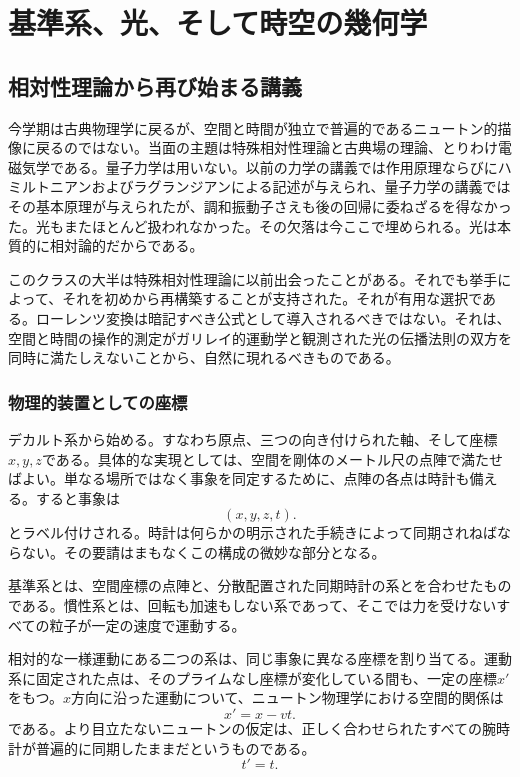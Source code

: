 \chapter{基準系、光、そして時空の幾何学}

\section{相対性理論から再び始まる講義}

今学期は古典物理学に戻るが、空間と時間が独立で普遍的であるニュートン的描像に戻るのではない。当面の主題は特殊相対性理論と古典場の理論、とりわけ電磁気学である。量子力学は用いない。以前の力学の講義では作用原理ならびにハミルトニアンおよびラグランジアンによる記述が与えられ、量子力学の講義ではその基本原理が与えられたが、調和振動子さえも後の回帰に委ねざるを得なかった。光もまたほとんど扱われなかった。その欠落は今ここで埋められる。光は本質的に相対論的だからである。

このクラスの大半は特殊相対性理論に以前出会ったことがある。それでも挙手によって、それを初めから再構築することが支持された。それが有用な選択である。ローレンツ変換は暗記すべき公式として導入されるべきではない。それは、空間と時間の操作的測定がガリレイ的運動学と観測された光の伝播法則の双方を同時に満たしえないことから、自然に現れるべきものである。

\subsection{物理的装置としての座標}

デカルト系から始める。すなわち原点、三つの向き付けられた軸、そして座標\(x,y,z\)である。具体的な実現としては、空間を剛体のメートル尺の点陣で満たせばよい。単なる場所ではなく事象を同定するために、点陣の各点は時計も備える。すると事象は
\begin{equation}
(x,y,z,t).
\end{equation}
とラベル付けされる。時計は何らかの明示された手続きによって同期されねばならない。その要請はまもなくこの構成の微妙な部分となる。

\begin{definition}
基準系とは、空間座標の点陣と、分散配置された同期時計の系とを合わせたものである。慣性系とは、回転も加速もしない系であって、そこでは力を受けないすべての粒子が一定の速度で運動する。
\end{definition}

相対的な一様運動にある二つの系は、同じ事象に異なる座標を割り当てる。運動系に固定された点は、そのプライムなし座標が変化している間も、一定の座標\(x'\)をもつ。\(x\)方向に沿った運動について、ニュートン物理学における空間的関係は
\begin{equation}
x'=x-vt.
\label{eq:sr1-galilean-space}
\end{equation}
である。より目立たないニュートンの仮定は、正しく合わせられたすべての腕時計が普遍的に同期したままだというものである。
\begin{equation}
t'=t.
\label{eq:sr1-absolute-time}
\end{equation}

